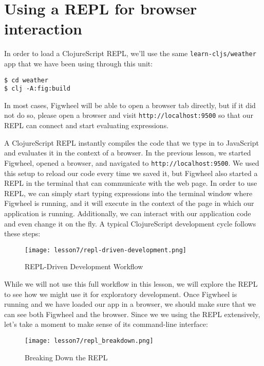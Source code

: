 \documentclass[10pt,twoside,openright]{memoir}
\begin{document}
\section{Using a REPL for browser interaction}

In order to load a ClojureScript REPL, we'll use the same
\texttt{learn-cljs/weather} app that we have been using through this
unit:

\begin{verbatim}
$ cd weather
$ clj -A:fig:build
\end{verbatim}

In most cases, Figwheel will be able to open a browser tab directly, but
if it did not do so, please open a browser and visit
\texttt{http://localhost:9500} so that our REPL can connect and start
evaluating expressions.

A ClojureScript REPL instantly compiles the code that we type in to
JavaScript and evaluates it in the context of a browser. In the previous
lesson, we started Figwheel, opened a browser, and navigated to
\texttt{http://localhost:9500}. We used this setup to reload our code
every time we saved it, but Figwheel also started a REPL in the terminal
that can communicate with the web page. In order to use REPL, we can
simply start typing expressions into the terminal window where Figwheel
is running, and it will execute in the context of the page in which our
application is running. Additionally, we can interact with our
application code and even change it on the fly. A typical ClojureScript
development cycle follows these steps:


\begin{figure}[H]
\caption{REPL-Driven Development Workflow}
\centering
\texttt{[image: lesson7/repl-driven-development.png]}
\end{figure}

While we will not use this full workflow in this lesson, we will explore
the REPL to see how we might use it for exploratory development. Once
Figwheel is running and we have loaded our app in a browser, we should
make sure that we can see both Figwheel and the browser. Since we we
using the REPL extensively, let's take a moment to make sense of its
command-line interface:

\begin{figure}[H]
\caption{Breaking Down the REPL}
\centering
\texttt{[image: lesson7/repl\_breakdown.png]}
\end{figure}
\end{document}
